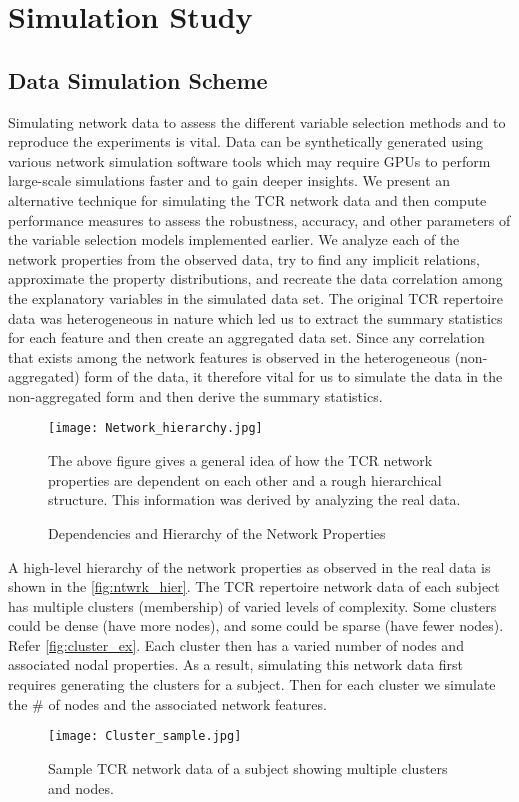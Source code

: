 \chapter{Simulation Study}
\section{Data Simulation Scheme}\label{sec:sim_scheme}
Simulating network data to assess the different variable selection methods and to reproduce the experiments is vital. Data can be synthetically generated using various network simulation software tools which may require GPUs to perform large-scale simulations faster and to gain deeper insights. We present an alternative technique for simulating the TCR network data and then compute performance measures to assess the robustness, accuracy, and other parameters of the variable selection models implemented earlier. We analyze each of the network properties from the observed data, try to find any implicit relations, approximate the property distributions, and recreate the data correlation among the explanatory variables in the simulated data set. The original TCR repertoire data was heterogeneous in nature which led us to extract the summary statistics for each feature and then create an aggregated data set. Since any correlation that exists among the network features is observed in the heterogeneous (non-aggregated) form of the data, it therefore vital for us to simulate the data in the non-aggregated form and then derive the summary statistics.\par
\begin{figure}[H]
\centering
\texttt{[image: Network\_hierarchy.jpg]}
\caption{Dependencies and Hierarchy of the Network Properties}%
{The above figure gives a general idea of how the TCR network properties are dependent on each other and a rough hierarchical structure. This information was derived by analyzing the real data.}
\label{fig:ntwrk_hier}
\end{figure}
A high-level hierarchy of the network properties as observed in the real data is shown in the \autoref{fig:ntwrk_hier}. The TCR repertoire network data of each subject has multiple clusters (membership) of varied levels of complexity. Some clusters could be dense (have more nodes), and some could be sparse (have fewer nodes). Refer \autoref{fig:cluster_ex}. Each cluster then has a varied number of nodes and associated nodal properties. As a result, simulating this network data first requires generating the clusters for a subject. Then for each cluster we simulate the \# of nodes and the associated network features.\par
\begin{figure}[H]
\centering
\texttt{[image: Cluster\_sample.jpg]}
\caption{Sample TCR network data of a subject showing multiple clusters and nodes.}
\label{fig:cluster_ex}
\end{figure}
